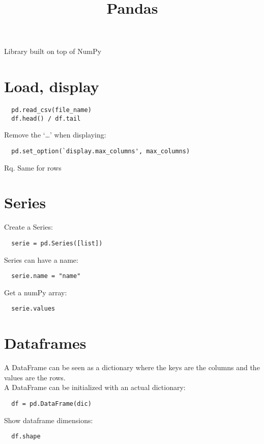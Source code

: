\documentclass[french]{article}
\title{Pandas}
\begin{document}
\date{}

\maketitle

\setlength{\parindent}{0cm}

Library built on top of NumPy

\section{Load, display}

\begin{verbatim}
  pd.read_csv(file_name)
  df.head() / df.tail
\end{verbatim}

Remove the `\ldots' when displaying:
\begin{verbatim}
  pd.set_option(`display.max_columns', max_columns)
\end{verbatim}
Rq. Same for rows

\section{Series}
Create a Series:
\begin{verbatim}
  serie = pd.Series([list])
\end{verbatim}

Series can have a name:
\begin{verbatim}
  serie.name = "name"
\end{verbatim}

Get a numPy array:
\begin{verbatim}
  serie.values
\end{verbatim}

\section{Dataframes}

A DataFrame can be seen as a dictionary where the keys are the columns and the values are the rows.\\
A DataFrame can be initialized with an actual dictionary:
\begin{verbatim}
  df = pd.DataFrame(dic)
\end{verbatim}

Show dataframe dimensions:
\begin{verbatim}
  df.shape
\end{verbatim}
\end{document}
